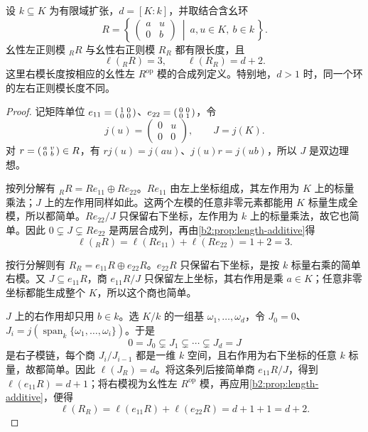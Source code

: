 \begin{proposition}\label{b2:prop:triangular-left-right-length}
	设 \(k\subseteq K\) 为有限域扩张，\(d=[K:k]\)，并取结合含幺环
	\[
		R=\left\{\,
		\begin{pmatrix}a&u\\0&b\end{pmatrix}
		\ \middle|\ a,u\in K,\ b\in k \,\right\}.
	\]
	幺性左正则模 \({}_RR\) 与幺性右正则模 \(R_R\) 都有限长度，且
	\[
		\ell({}_RR)=3,\qquad \ell(R_R)=d+2.
	\]
	这里右模长度按相应的幺性左 \(R^{\mathrm{op}}\) 模的合成列定义。特别地，\(d>1\) 时，同一个环的左右正则模长度不同。
\end{proposition}
\begin{proof}
	记矩阵单位 \(e_{11}=\begin{psmallmatrix}1&0\\0&0\end{psmallmatrix}\)、\(e_{22}=\begin{psmallmatrix}0&0\\0&1\end{psmallmatrix}\)，令
	\[
		j(u)=\begin{pmatrix}0&u\\0&0\end{pmatrix},\qquad J=j(K).
	\]
	对 \(r=\begin{psmallmatrix}a&v\\0&b\end{psmallmatrix}\in R\)，有 \(rj(u)=j(au)\)、\(j(u)r=j(ub)\)，所以 \(J\) 是双边理想。

	按列分解有 \({}_RR=Re_{11}\oplus Re_{22}\)。\(Re_{11}\) 由左上坐标组成，其左作用为 \(K\) 上的标量乘法；\(J\) 上的左作用同样如此。这两个左模的任意非零元素都能用 \(K\) 标量生成全模，所以都简单。\(Re_{22}/J\) 只保留右下坐标，左作用为 \(k\) 上的标量乘法，故它也简单。因此 \(0\subsetneq J\subsetneq Re_{22}\) 是两层合成列，再由\cref{b2:prop:length-additive}得
	\[
		\ell({}_RR)=\ell(Re_{11})+\ell(Re_{22})=1+2=3.
	\]

	按行分解则有 \(R_R=e_{11}R\oplus e_{22}R\)。\(e_{22}R\) 只保留右下坐标，是按 \(k\) 标量右乘的简单右模。又 \(J\subseteq e_{11}R\)，商 \(e_{11}R/J\) 只保留左上坐标，其右作用是乘 \(a\in K\)；任意非零坐标都能生成整个 \(K\)，所以这个商也简单。

	\(J\) 上的右作用却只用 \(b\in k\)。选 \(K/k\) 的一组基 \(\omega_1,\ldots,\omega_d\)，令 \(J_0=0\)、\(J_i=j(\operatorname{span}_k\{\omega_1,\ldots,\omega_i\})\)。于是
	\[
		0=J_0\subsetneq J_1\subsetneq\cdots\subsetneq J_d=J
	\]
	是右子模链，每个商 \(J_i/J_{i-1}\) 都是一维 \(k\) 空间，且右作用为右下坐标的任意 \(k\) 标量，故都简单。因此 \(\ell(J_R)=d\)。将这条列后接简单商 \(e_{11}R/J\)，得到 \(\ell(e_{11}R)=d+1\)；将右模视为幺性左 \(R^{\mathrm{op}}\) 模，再应用\cref{b2:prop:length-additive}，便得
	\[
		\ell(R_R)=\ell(e_{11}R)+\ell(e_{22}R)=d+1+1=d+2.
	\]
\end{proof}

